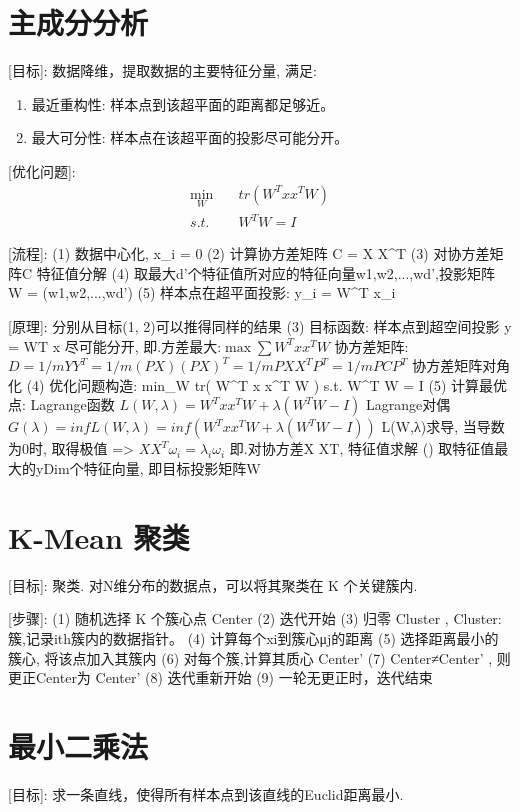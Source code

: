 \documentclass{article}
\title{}\date{} \setlength{\parindent}{0pt} \linespread{1.25}
\begin{document}
\section{主成分分析}
		[目标]:
			数据降维，提取数据的主要特征分量, 满足:
    			\begin{enumerate}
    			    \item 最近重构性: 样本点到该超平面的距离都足够近。
    			    \item 最大可分性: 样本点在该超平面的投影尽可能分开。
    			\end{enumerate}
			
		[优化问题]:
    		\begin{align*}
    			\min_W  &\quad	tr( W^T x x^T W )\\
    			s.t.    &\quad	W^T W = I
    		\end{align*}
			
		[流程]:
			(1) 数据中心化, \sum \vec x_i = 0
			(2) 计算协方差矩阵 C = X X^T
			(3) 对协方差矩阵C 特征值分解
			(4) 取最大d'个特征值所对应的特征向量{w1,w2,...,wd'},投影矩阵 W = (w1,w2,...,wd')
			(5) 样本点在超平面投影: y_i = W^T x_i
			
		[原理]:
				分别从目标(1, 2)可以推得同样的结果
			(3)	目标函数: 样本点到超空间投影 y = WT x 尽可能分开, 即.方差最大:$\max \sum W^T x x^T W$
				协方差矩阵:
					$D = 1/m Y Y^T = 1/m (PX) (PX)^T = 1/m P X X^T P^T = 1/m P C P^T$
				协方差矩阵对角化
			(4) 优化问题构造:
					min_W		tr( W^T x x^T W )
					s.t.		W^T W = I
			(5) 计算最优点:
				Lagrange函数 $L(W,λ) = W^T x x^T W + λ( W^T W - I )$
				Lagrange对偶 $G(λ) = inf L(W,λ) = inf (W^T x x^T W + λ( W^T W - I ))$
				L(W,λ)求导, 当导数为0时, 取得极值
				=>	$X X^T ω_i = λ_i ω_i$
				即.对协方差X XT, 特征值求解
			()	取特征值最大的yDim个特征向量, 即目标投影矩阵W


\section{K-Mean 聚类}
		[目标]:
			聚类. 对N维分布的数据点，可以将其聚类在 K 个关键簇内.
			
		[步骤]:
			(1) 随机选择 K 个簇心点 Center
			(2) 迭代开始
				(3) 归零 Cluster , Cluster: 簇,记录ith簇内的数据指针。
				(4) 计算每个xi到簇心μj的距离
					(5) 选择距离最小的簇心, 将该点加入其簇内
				(6) 对每个簇,计算其质心 Center'
				(7) Center≠Center' , 则更正Center为 Center'
				(8) 迭代重新开始
			(9) 一轮无更正时，迭代结束

\section{最小二乘法}
		[目标]:
			求一条直线，使得所有样本点到该直线的Euclid距离最小.
			
\end{document}
